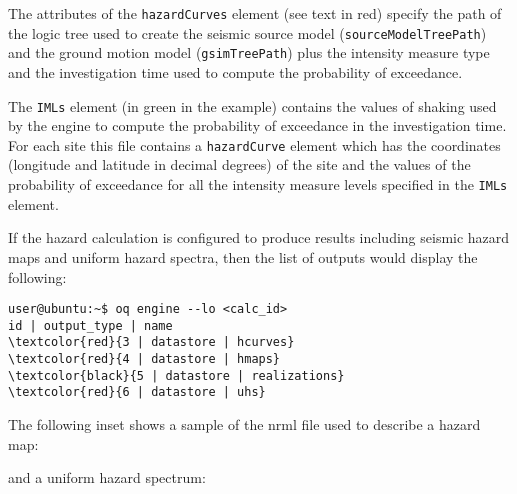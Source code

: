 The attributes of the \texttt{hazardCurves} element (see text in red) specify
the path of the logic tree used to create the seismic source model
(\texttt{source\-Model\-TreePath}) and the ground motion model
(\texttt{gsim\-Tree\-Path}) plus the intensity measure type and the
investigation time used to compute the probability of exceedance.

The \texttt{IMLs} element (in green in the example) contains the values of
shaking used by the engine to compute the probability of exceedance in the
investigation time. For each site this file contains a \texttt{hazardCurve}
element which has the coordinates (longitude and latitude in decimal degrees)
of the site and the values of the probability of exceedance for all the
intensity measure levels specified in the \texttt{IMLs} element.

If the hazard calculation is configured to produce results including seismic hazard maps and uniform hazard spectra, then the list of outputs would display the following:

\begin{Verbatim}[frame=single, commandchars=\\\{\}, fontsize=\small]
user@ubuntu:~$ oq engine --lo <calc_id>
id | output_type | name
\textcolor{red}{3 | datastore | hcurves}
\textcolor{red}{4 | datastore | hmaps}
\textcolor{black}{5 | datastore | realizations}
\textcolor{red}{6 | datastore | uhs}
\end{Verbatim}

The following inset shows a sample of the nrml file used to describe a hazard map:



\noindent and a uniform hazard spectrum:

